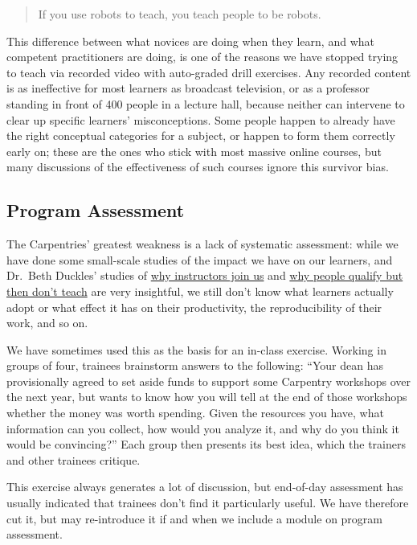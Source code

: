 \begin{quote}
If you use robots to teach, you teach people to be robots.
\end{quote}

This difference between what novices are doing when they learn, and what
competent practitioners are doing, is one of the reasons we have stopped
trying to teach via recorded video with auto-graded drill exercises. Any
recorded content is as ineffective for most learners as broadcast
television, or as a professor standing in front of 400 people in a
lecture hall, because neither can intervene to clear up specific
learners' misconceptions. Some people happen to already have the right
conceptual categories for a subject, or happen to form them correctly
early on; these are the ones who stick with most massive online courses,
but many discussions of the effectiveness of such courses ignore this
survivor bias.

\subsection{Program Assessment}\label{program-assessment}

The Carpentries' greatest weakness is a lack of systematic assessment:
while we have done some small-scale studies of the impact we have on our
learners, and Dr.~Beth Duckles' studies of
\href{http://software-carpentry.org/files/bib/duckles-instructor-engagement-2016.pdf}{why
instructors join us} and
\href{http://software-carpentry.org/files/bib/duckles-non-instructor-report-2016.pdf}{why
people qualify but then don't teach} are very insightful, we still don't
know what learners actually adopt or what effect it has on their
productivity, the reproducibility of their work, and so on.

We have sometimes used this as the basis for an in-class exercise.
Working in groups of four, trainees brainstorm answers to the following:
``Your dean has provisionally agreed to set aside funds to support some
Carpentry workshops over the next year, but wants to know how you will
tell at the end of those workshops whether the money was worth spending.
Given the resources you have, what information can you collect, how
would you analyze it, and why do you think it would be convincing?''
Each group then presents its best idea, which the trainers and other
trainees critique.

This exercise always generates a lot of discussion, but end-of-day
assessment has usually indicated that trainees don't find it
particularly useful. We have therefore cut it, but may re-introduce it
if and when we include a module on program assessment.
